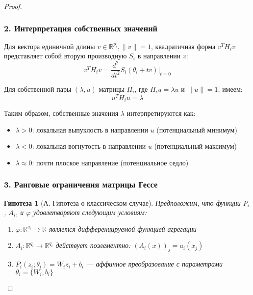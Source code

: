 \documentclass[a4paper,12pt]{article}
\newtheorem{hypothesis}{Гипотеза}
\begin{document}
\begin{proof}
    \subsubsection*{2. Интерпретация собственных значений}
    
    Для вектора единичной длины $v \in \mathbb{R}^{p_i}, \|v\|=1$, квадратичная форма $v^T H_i v$ представляет собой вторую производную $S_i$ в направлении $v$:
    \begin{equation}
    v^T H_i v = \frac{d^2}{dt^2}S_i(\theta_i + tv)\bigg|_{t=0}
    \end{equation}
    
    Для собственной пары $(\lambda,u)$ матрицы $H_i$, где $H_i u = \lambda u$ и $\|u\|=1$, имеем:
    \begin{equation}
    u^T H_i u = \lambda
    \end{equation}
    
    Таким образом, собственные значения $\lambda$ интерпретируются как:
    \begin{itemize}
    \item $\lambda > 0$: локальная выпуклость в направлении $u$ (потенциальный минимум)
    \item $\lambda < 0$: локальная вогнутость в направлении $u$ (потенциальный максимум)
    \item $\lambda \approx 0$: почти плоское направление (потенциальное седло)
    \end{itemize}
    
    \subsubsection*{3. Ранговые ограничения матрицы Гессе}
    
    \begin{hypothesis}[А. Гипотеза о классическом случае]
    Предположим, что функции $P_i$, $A_i$, и $\varphi$ удовлетворяют следующим условиям:
    \begin{enumerate}
    \item[(А.1)] $\varphi: \mathbb{R}^{q_i} \rightarrow \mathbb{R}$ является дифференцируемой функцией агрегации
    \item[(А.2)] $A_i: \mathbb{R}^{q_i} \rightarrow \mathbb{R}^{q_i}$ действует поэлементно: $(A_i(x))_j = a_i(x_j)$
    \item[(А.3)] $P_i(z_i; \theta_i) = W_i z_i + b_i$ — аффинное преобразование с параметрами $\theta_i = \{W_i, b_i\}$
    \end{enumerate}
    \end{hypothesis}
    

\end{proof}
\end{document}
